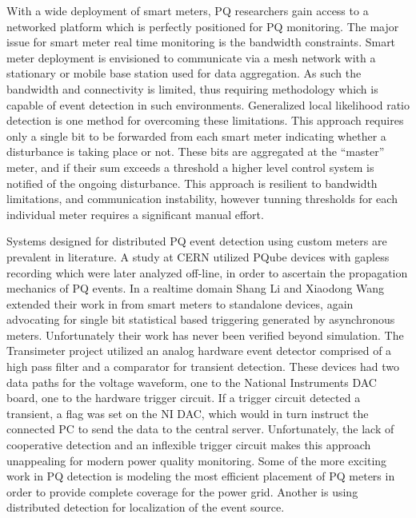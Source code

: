With a wide deployment of smart meters, PQ researchers gain access to a networked platform which is perfectly positioned for PQ monitoring.\cite{hoglund2012using} The major issue for smart meter real time monitoring is the bandwidth constraints.
Smart meter deployment is envisioned to communicate via a mesh network with a stationary or mobile base station used for data aggregation.
As such the bandwidth and connectivity is limited, thus requiring methodology which is capable of event detection in such environments.
Generalized local likelihood ratio detection is one method for overcoming these limitations.
This approach requires only a single bit to be forwarded from each smart meter indicating whether a disturbance is taking place or not.
These bits are aggregated at the ``master'' meter, and if their sum exceeds a threshold a higher level control system is notified of the ongoing disturbance.\cite{li2016cooperative} This approach is resilient to bandwidth limitations, and communication instability, however tunning thresholds for each individual meter requires a significant manual effort.

Systems designed for distributed PQ event detection using custom meters are prevalent in literature.
A study at CERN utilized PQube devices with gapless recording which were later analyzed off-line, in order to ascertain the propagation mechanics of PQ events.\cite{kahle2016power} In a realtime domain Shang Li and Xiaodong Wang extended their work in \cite{li2016cooperative} from smart meters to standalone devices, again advocating for single bit statistical based triggering generated by asynchronous meters.\cite{li2013monitoring} Unfortunately their work has never been verified beyond simulation.
The Transimeter project utilized an analog hardware event detector comprised of a high pass filter and a comparator for transient detection.
These devices had two data paths for the voltage waveform, one to the National Instruments DAC board, one to the hardware trigger circuit.
If a trigger circuit detected a transient, a flag was set on the NI DAC, which would in turn instruct the connected PC to send the data to the central server.\cite{daponte2004transientmeter} Unfortunately, the lack of cooperative detection and an inflexible trigger circuit makes this approach unappealing for modern power quality monitoring.
Some of the more exciting work in PQ detection is modeling the most efficient placement of PQ meters in order to provide complete coverage for the power grid. \cite{won2006new} Another is using distributed detection for localization of the event source.\cite{parsons1998direction} \cite{polajvzer2017evaluation}

